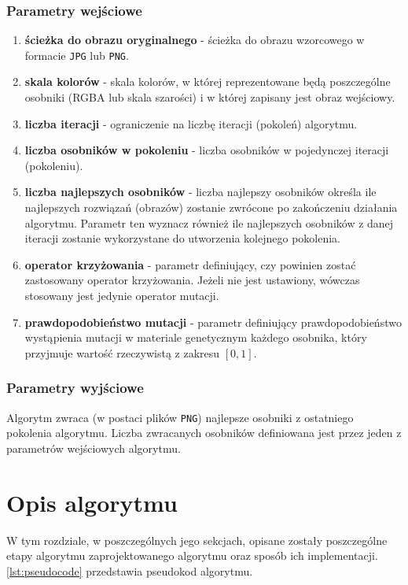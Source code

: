 \subsubsection{Parametry wejściowe}
\begin{enumerate}
    \item \textbf{ścieżka do obrazu oryginalnego} - ścieżka do obrazu wzorcowego w formacie \texttt{JPG} lub \texttt{PNG}.
    \item \textbf{skala kolorów} - skala kolorów, w której reprezentowane będą poszczególne osobniki (RGBA lub skala szarości) i w której zapisany jest obraz wejściowy.
    \item \textbf{liczba iteracji} - ograniczenie na liczbę iteracji (pokoleń) algorytmu.
    \item \textbf{liczba osobników w pokoleniu} - liczba osobników w pojedynczej iteracji (pokoleniu).
    \item \textbf{liczba najlepszych osobników} - liczba najlepszy osobników określa ile najlepszych rozwiązań (obrazów) zostanie zwrócone po zakończeniu działania algorytmu. Parametr ten wyznacz również ile najlepszych osobników z danej iteracji zostanie wykorzystane do utworzenia kolejnego pokolenia.
    \item \textbf{operator krzyżowania} - parametr definiujący, czy powinien zostać zastosowany operator krzyżowania. Jeżeli nie jest ustawiony, wówczas stosowany jest jedynie operator mutacji.  
    \item \textbf{prawdopodobieństwo mutacji} - parametr definiujący prawdopodobieństwo wystąpienia mutacji w materiale genetycznym każdego osobnika, który przyjmuje wartość rzeczywistą z zakresu $[0, 1]$.
\end{enumerate}

\subsubsection{Parametry wyjściowe}

Algorytm zwraca (w postaci plików \texttt{PNG}) najlepsze osobniki z ostatniego pokolenia algorytmu. Liczba zwracanych osobników definiowana jest przez jeden z parametrów wejściowych algorytmu.

\section{Opis algorytmu}

W tym rozdziale, w poszczególnych jego sekcjach, opisane zostały poszczególne etapy algorytmu zaprojektowanego algorytmu oraz sposób ich implementacji. \ref{lst:pseudocode} przedstawia pseudokod algorytmu.


